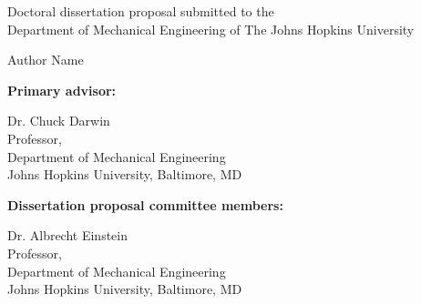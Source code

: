 



\TitlePageSpacing \thispagestyle{empty}

\begin{center}
    Doctoral dissertation proposal submitted to the \\
    Department of Mechanical Engineering of The Johns Hopkins University
    
    \vspace{0.5in}                      %
    { \par}  
    
    \vspace{0.25in}                     %
    
    Author Name                         %
\end{center}


\vspace{0.5in}
\textbf{Primary advisor:}

Dr. Chuck Darwin \\
Professor, \\
Department of Mechanical Engineering \\
Johns Hopkins University, Baltimore, MD


\textbf{Dissertation proposal committee members:} 

Dr. Albrecht Einstein \\
Professor, \\
Department of Mechanical Engineering \\
Johns Hopkins University, Baltimore, MD

